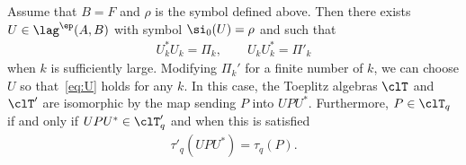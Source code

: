 \begin{theo}\label{theo:unitary_equivalence}
Assume that $B = F$ and $\rho$ is the symbol defined above. Then there exists $U \in \lag ^{\ep}(A,B)$ with symbol $\si_0(U) = \rho$ and such that
\begin{gather}\label{eq:U}
U^*_k U_k = \Pi_k, \qquad U_k U_k^* = \Pi'_k
\end{gather}
when $k$ is sufficiently large. Modifying $\Pi_k'$ for a finite number of $k$, we can choose $U$ so that~\eqref{eq:U} holds for any $k$. In this case, the Toeplitz algebras $ \clT$ and $\clT'$ are isomorphic by the map sending $P$ into $U P U^* $. Furthermore, $P \in \clT_q$ if and only if $UPU^* \in \clT'_q$ and when this is satisfied
\begin{gather}\label{eq:symbol_iso}
\tau'_q (U P U^*) = \tau_q (P).
\end{gather}
\end{theo}

